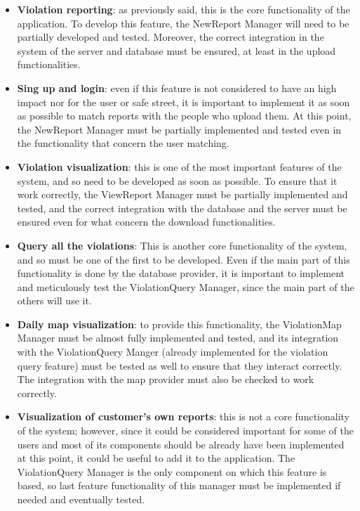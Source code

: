 \documentclass[../RASD.tex]{subfiles}
\begin{document}
    \begin{itemize}
        \item \textbf{Violation reporting}: as previously said, this is the core functionality of the application. To develop this feature, the NewReport Manager will need to be partially developed and tested. Moreover, the correct integration in the system of the server and database must be ensured, at least in the upload functionalities.

        \item \textbf{Sing up and login}: even if this feature is not considered to have an high impact nor for the user or safe street, it is important to implement it as soon as possible to match reports with the people who upload them. At this point, the NewReport Manager must be partially implemented and tested even in the functionality that concern the user matching.

        \item \textbf{Violation visualization}: this is one of the most important features of the system, and so need to be developed as soon as possible. To ensure that it work correctly, the ViewReport Manager must be partially implemented and tested, and the correct integration with the database and the server must be ensured even for what concern the download functionalities.

        \item \textbf{Query all the violations}: This is another core functionality of the system, and so must be one of the first to be developed. Even if the main part of this functionality is done by the database provider, it is important to implement and meticulously test the ViolationQuery Manager, since the main part of the others will use it.

        \item \textbf{Daily map visualization}: to provide this functionality, the ViolationMap Manager must be almost fully implemented and tested, and its integration with the ViolationQuery Manger (already implemented for the violation query feature) must be tested as well to ensure that they interact correctly. The integration with the map provider must also be checked to work correctly.

        \item \textbf{Visualization of customer’s own reports}: this is not a core functionality of the system; however, since it could be considered important for some of the users and most of its components should be already have been implemented at this point, it could be useful to add it to the application. The ViolationQuery Manager is the only component on which this feature is based, so last feature functionality of this manager must be implemented if needed and eventually tested.


\end{itemize}
\end{document}
